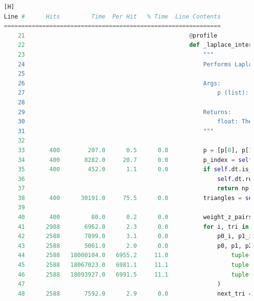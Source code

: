 \documentclass{article}
\begin{document}
\begin{lstlisting}[language=Python, caption={Interpolation Code with Execution Time}, label={code1},basicstyle={\fontsize{5.5}{10}\selectfont\ttfamily}][H]
Line #      Hits         Time  Per Hit   % Time  Line Contents
==============================================================
    21                                               @profile
    22                                               def _laplace_interpolate(self, p):
    23                                                   """
    24                                                   Performs Laplace interpolation at a given point.
    25                                           
    26                                                   Args:
    27                                                       p (list): The coordinates of the point [x, y].
    28                                           
    29                                                   Returns:
    30                                                       float: The interpolated value at the given point.
    31                                                   """
    32                                           
    33       400        207.0      0.5      0.0          p = [p[0], p[1], 0.0]
    34       400       8282.0     20.7      0.0          p_index = self.dt.insert_one_pt(p[0], p[1], p[2])
    35       400        452.0      1.1      0.0          if self.dt.is_vertex_convex_hull(p_index):  # impossible to interpolate
    36                                                       self.dt.remove(p_index)
    37                                                       return np.nan
    38       400      30191.0     75.5      0.0          triangles = self.dt.incident_triangles_to_vertex(p_index)
    39                                           
    40       400         80.0      0.2      0.0          weight_z_pairs = []
    41      2988       6962.0      2.3      0.0          for i, tri in enumerate(triangles):
    42      2588       7899.0      3.1      0.0              p0_i, p1_i, p2_i = tri
    43      2588       5061.0      2.0      0.0              p0, p1, p2 = (
    44      2588   18000104.0   6955.2     11.0                  tuple(self.dt.points[p0_i]),
    45      2588   18067023.0   6981.1     11.1                  tuple(self.dt.points[p1_i]),
    46      2588   18093927.0   6991.5     11.1                  tuple(self.dt.points[p2_i]),
    47                                                       )
    48      2588       7592.0      2.9      0.0              next_tri = triangles[(i + 1) % len(triangles)]

\end{lstlisting}
\end{document}
